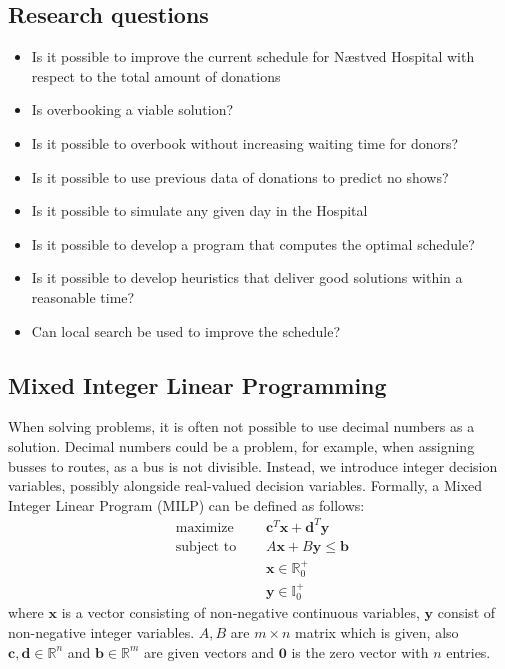 \documentclass[a4paper,12pt]{article}
\begin{document}
\subsection{Research questions}

\begin{itemize}
    \item Is it possible to improve the current schedule for Næstved Hospital with respect to the total amount of donations
    \item Is overbooking a viable solution?
    \item Is it possible to overbook without increasing waiting time for donors?
    \item Is it possible to use previous data of donations to predict no shows?
    \item Is it possible to simulate any given day in the Hospital
    \item Is it possible to develop a program that computes the optimal schedule?
    \item Is it possible to develop heuristics that deliver good solutions within a reasonable time?
    \item Can local search be used to improve the schedule?
\end{itemize}

\subsection{Mixed Integer Linear Programming}

When solving problems, it is often not possible to use decimal numbers as a solution. Decimal numbers could be a problem, for example, when assigning busses to routes, as a bus is not divisible. Instead, we introduce integer decision variables, possibly alongside real-valued decision variables. Formally, a Mixed Integer Linear Program (MILP) can be defined as follows:
$$
\begin{aligned} 
    \text { maximize } & \quad \mathbf{c}^{T} \mathbf{x} + \mathbf{d}^{T} \mathbf{y} \\
    \text { subject to } & \quad A \mathbf{x} + B \mathbf{y} \leq \mathbf{b} \\
    & \quad \mathbf{x} \in \mathbb{R}_{0}^{+} \\
    & \quad \mathbf{y} \in \mathbb{I}_{0}^{+}
\end{aligned}
$$
where $\mathbf{x}$ is a vector consisting of non-negative continuous variables, $\mathbf{y}$ consist of non-negative integer variables. $A, B$ are $m \times n$ matrix which is given, also $\mathbf{c}, \mathbf{d} \in \mathbb{R}^n$ and $\mathbf{b} \in \mathbb{R}^m$ are given vectors and $\mathbf{0}$ is the zero vector with $n$ entries.
\end{document}
